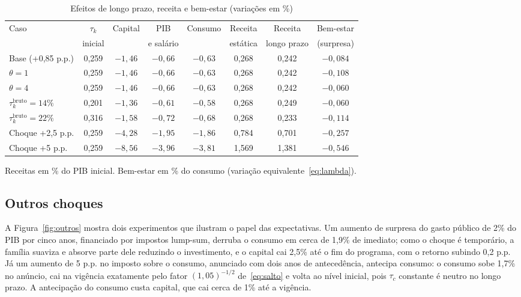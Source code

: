 \documentclass[11pt,a4paper]{article}
\begin{document}
\begin{table}[ht]
\centering
\caption{Efeitos de longo prazo, receita e bem-estar (variações em \%)}
\label{tab:sensibilidade}
\small
\begin{tabular}{lccccccc}
\toprule
Caso & $\tau_k$ & Capital & PIB & Consumo & Receita & Receita & Bem-estar\\
 & inicial & & e salário & & estática & longo prazo & (surpresa)\\
\midrule
Base (+0,85 p.p.) & 0,259 & $-1{,}46$ & $-0{,}66$ & $-0{,}63$ & 0,268 & 0,242 & $-0{,}084$\\
$\theta=1$ & 0,259 & $-1{,}46$ & $-0{,}66$ & $-0{,}63$ & 0,268 & 0,242 & $-0{,}108$\\
$\theta=4$ & 0,259 & $-1{,}46$ & $-0{,}66$ & $-0{,}63$ & 0,268 & 0,242 & $-0{,}060$\\
$\tau_k^{\text{bruto}}=14\%$ & 0,201 & $-1{,}36$ & $-0{,}61$ & $-0{,}58$ & 0,268 & 0,249 & $-0{,}060$\\
$\tau_k^{\text{bruto}}=22\%$ & 0,316 & $-1{,}58$ & $-0{,}72$ & $-0{,}68$ & 0,268 & 0,233 & $-0{,}114$\\
Choque +2,5 p.p. & 0,259 & $-4{,}28$ & $-1{,}95$ & $-1{,}86$ & 0,784 & 0,701 & $-0{,}257$\\
Choque +5 p.p. & 0,259 & $-8{,}56$ & $-3{,}96$ & $-3{,}81$ & 1,569 & 1,381 & $-0{,}546$\\
\bottomrule
\end{tabular}

\smallskip
\footnotesize Receitas em \% do PIB inicial. Bem-estar em \% do consumo
(variação equivalente~\eqref{eq:lambda}).
\end{table}

\subsection{Outros choques}
A Figura~\ref{fig:outros} mostra dois experimentos que ilustram o papel das
expectativas. Um aumento de surpresa do gasto público de 2\% do PIB por cinco
anos, financiado por impostos lump-sum, derruba o consumo em cerca de 1,9\% de
imediato; como o choque é temporário, a família suaviza e absorve parte dele
reduzindo o investimento, e o capital cai 2,5\% até o fim do programa, com o
retorno subindo 0,2 p.p. Já um aumento de 5 p.p. no imposto sobre o consumo,
anunciado com dois anos de antecedência, antecipa consumo: o consumo sobe 1,7\%
no anúncio, cai na vigência exatamente pelo fator $(1{,}05)^{-1/2}$
de~\eqref{eq:salto} e volta ao nível inicial, pois $\tau_c$ constante é neutro no
longo prazo. A antecipação do consumo custa capital, que cai cerca de 1\% até a
vigência.
\end{document}
